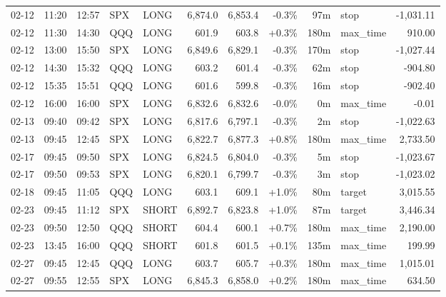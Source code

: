 \documentclass[11pt,a4paper,twoside]{article}
\begin{document}
\begin{center}
\begin{longtable}{>{\color{txtmain}}l l l l l r r r r >{\color{txtmain}}l r}
02-12 & 11:20 & 12:57 & SPX & LONG & 6,874.0 & 6,853.4 & \textcolor{lossred}{-0.3\%} & 97m & stop & \textcolor{lossred}{-1,031.11} \\
02-12 & 11:30 & 14:30 & QQQ & LONG & 601.9 & 603.8 & \textcolor{wingreen}{+0.3\%} & 180m & max\_time & \textcolor{wingreen}{910.00} \\
02-12 & 13:00 & 15:50 & SPX & LONG & 6,849.6 & 6,829.1 & \textcolor{lossred}{-0.3\%} & 170m & stop & \textcolor{lossred}{-1,027.44} \\
02-12 & 14:30 & 15:32 & QQQ & LONG & 603.2 & 601.4 & \textcolor{lossred}{-0.3\%} & 62m & stop & \textcolor{lossred}{-904.80} \\
02-12 & 15:35 & 15:51 & QQQ & LONG & 601.6 & 599.8 & \textcolor{lossred}{-0.3\%} & 16m & stop & \textcolor{lossred}{-902.40} \\
02-12 & 16:00 & 16:00 & SPX & LONG & 6,832.6 & 6,832.6 & \textcolor{lossred}{-0.0\%} & 0m & max\_time & \textcolor{lossred}{-0.01} \\
02-13 & 09:40 & 09:42 & SPX & LONG & 6,817.6 & 6,797.1 & \textcolor{lossred}{-0.3\%} & 2m & stop & \textcolor{lossred}{-1,022.63} \\
02-13 & 09:45 & 12:45 & SPX & LONG & 6,822.7 & 6,877.3 & \textcolor{wingreen}{+0.8\%} & 180m & max\_time & \textcolor{wingreen}{2,733.50} \\
02-17 & 09:45 & 09:50 & SPX & LONG & 6,824.5 & 6,804.0 & \textcolor{lossred}{-0.3\%} & 5m & stop & \textcolor{lossred}{-1,023.67} \\
02-17 & 09:50 & 09:53 & SPX & LONG & 6,820.1 & 6,799.7 & \textcolor{lossred}{-0.3\%} & 3m & stop & \textcolor{lossred}{-1,023.02} \\
02-18 & 09:45 & 11:05 & QQQ & LONG & 603.1 & 609.1 & \textcolor{wingreen}{+1.0\%} & 80m & target & \textcolor{wingreen}{3,015.55} \\
02-23 & 09:45 & 11:12 & SPX & SHORT & 6,892.7 & 6,823.8 & \textcolor{wingreen}{+1.0\%} & 87m & target & \textcolor{wingreen}{3,446.34} \\
02-23 & 09:50 & 12:50 & QQQ & SHORT & 604.4 & 600.1 & \textcolor{wingreen}{+0.7\%} & 180m & max\_time & \textcolor{wingreen}{2,190.00} \\
02-23 & 13:45 & 16:00 & QQQ & SHORT & 601.8 & 601.5 & \textcolor{wingreen}{+0.1\%} & 135m & max\_time & \textcolor{wingreen}{199.99} \\
02-27 & 09:45 & 12:45 & QQQ & LONG & 603.7 & 605.7 & \textcolor{wingreen}{+0.3\%} & 180m & max\_time & \textcolor{wingreen}{1,015.01} \\
02-27 & 09:55 & 12:55 & SPX & LONG & 6,845.3 & 6,858.0 & \textcolor{wingreen}{+0.2\%} & 180m & max\_time & \textcolor{wingreen}{634.50} \\
\end{longtable}
\end{center}
\clearpage
\end{document}
